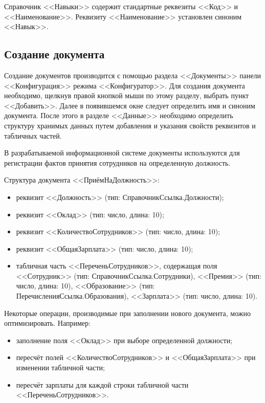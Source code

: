 Справочник <<Навыки>> содержит стандартные реквезиты <<Код>> и
<<Наименование>>. Реквизиту <<Наименование>> установлен синоним <<Навык>>. 


\subsection{Создание документа}

Создание документов производится с помощью раздела <<Документы>>
панели <<Конфигурация>> режима <<Конфигуратор>>.
Для создания документа необходимо, щелкнув правой кнопкой мыши по этому
разделу, выбрать пункт <<Добавить>>. Далее в появившемся окне
следует определить имя и синоним документа.
После этого в разделе <<Данные>> необходимо определить структуру
хранимых данных путем добавления и указания свойств реквизитов
и табличных частей.

В разрабатываемой информационной системе документы используются для
регистрации фактов принятия сотрудников на определенную должность.

Структура документа <<ПриёмНаДолжность>>:
\begin{itemize}
  \item реквизит <<Должность>> (тип: СправочникСсылка.Должности);
  \item реквизит <<Оклад>> (тип: число, длина: 10);
  \item реквизит <<КоличествоСотрудников>> (тип: число, длина: 10);
  \item реквизит <<ОбщаяЗарплата>> (тип: число, длина: 10);
  \item табличная часть <<ПереченьСотрудников>>, содержащая поля
    <<Сотрудник>> (тип: СправочникСсылка.Сотрудники),
    <<Премия>> (тип: число, длина: 10),
    <<Образование>> (тип: ПеречисленияСсылка.Образования),
    <<Зарплата>> (тип: число, длина: 10).
\end{itemize}

Некоторые операции, производимые при заполнении нового документа,
можно оптимизировать. Например:
\begin{itemize}
  \item заполнение поля <<Оклад>> при выборе определенной должности;
  \item пересчёт полей <<КоличествоСотрудников>> и <<ОбщаяЗарплата>>
    при изменении табличной части; 
  \item пересчёт зарплаты для каждой строки табличной части <<ПереченьСотрудников>>.
\end{itemize}

\pagebreak

